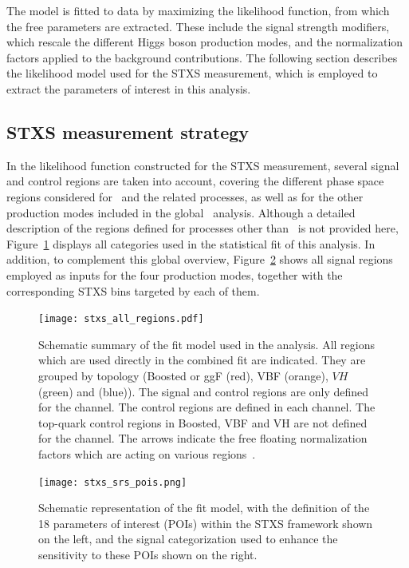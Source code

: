   The model is fitted to data by maximizing the likelihood function, 
  from which the free parameters are extracted. 
  These include the signal strength modifiers, which rescale the different Higgs boson production modes, 
  and the normalization factors applied to the background contributions. 
  The following section describes the likelihood model used for the STXS measurement, 
  which is employed to extract the parameters of interest in this analysis.
  
\subsection{STXS measurement strategy}
\label{stxs_setup}

In the likelihood function constructed for the STXS measurement, several signal and control regions are taken into account, 
covering the different phase space regions considered for \ttHtt\ and the related processes, as well as for the other production modes included in the global \htautau\ analysis. 
Although a detailed description of the regions defined for processes other than \ttH\ is not provided here, 
Figure~\ref{fig:stxs_all_regions} displays all categories used in the statistical fit of this analysis. 
In addition, to complement this global overview, Figure~\ref{fig:stxs_srs_pois} shows all signal regions employed as inputs for the four production modes, 
together with the corresponding STXS bins targeted by each of them.

\begin{figure}[htbp]
  \centering
  \texttt{[image: stxs\_all\_regions.pdf]}
  \caption{Schematic summary of the fit model used in the analysis. All regions which are used directly in the combined fit are indicated. They are grouped by topology (Boosted or ggF (red), VBF (orange), $VH$ (green) and \ttH (blue)). The \ttH signal and control regions are only defined for the \tauhadhad channel. The \ztautau control regions are defined in each channel. The top-quark control regions in Boosted, VBF and VH are not defined for the \tauhadhad channel. The arrows indicate the free floating normalization factors which are acting on various regions~\cite{differential_htautau}.}
  \label{fig:stxs_all_regions}
\end{figure}

\begin{figure}[htbp]
  \centering
  \texttt{[image: stxs\_srs\_pois.png]}
  \caption{Schematic representation of the fit model, with the definition of the 18 parameters of interest (POIs) within the STXS framework shown on the left, and the signal categorization used to enhance the sensitivity to these POIs shown on the right.}
  \label{fig:stxs_srs_pois}
\end{figure}

